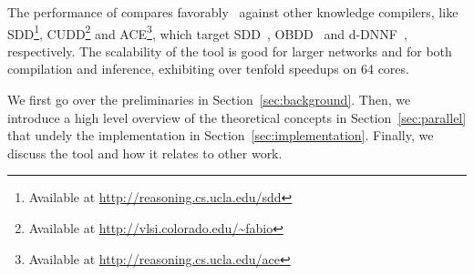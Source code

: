 The performance of \toolname compares favorably~\cite{dal2018parallel} against other knowledge compilers, like  SDD\footnote{Available at \url{http://reasoning.cs.ucla.edu/sdd}}, CUDD\footnote{Available at \url{http://vlsi.colorado.edu/~fabio}} and ACE\footnote{Available at \url{http://reasoning.cs.ucla.edu/ace}}, which target SDD~\cite{darwiche2011sdd}, OBDD~\cite{bryant1986graph} and d-DNNF~\cite{darwiche2002knowledge}, respectively.
The scalability of the tool is good for larger networks and for both compilation and inference, exhibiting over tenfold speedups on 64 cores.




We first go over the preliminaries in Section~\ref{sec:background}. Then, we introduce a high level overview of the theoretical concepts in Section~\ref{sec:parallel} that undely the implementation in Section~\ref{sec:implementation}. Finally, we discuss the tool and how it relates to other work.
